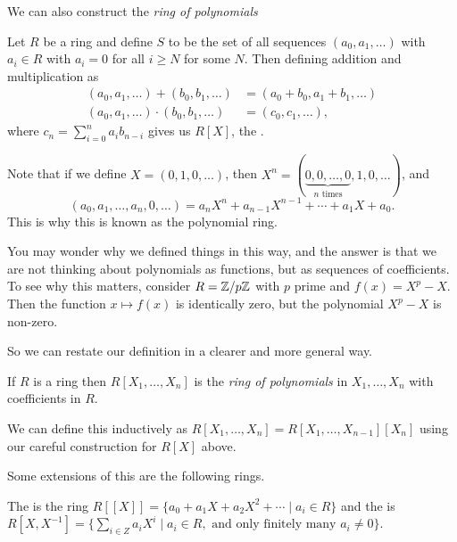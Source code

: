 \documentclass[a4paper]{scrreprt}
\begin{document}
 We can also construct the \emph{ring of polynomials} 

\begin{definition}
	Let $R$ be a ring and define $S$ to be  the set of all sequences $(a_0, a_1, \dots)$ with $a_i \in R$ with $a_i = 0$ for all $i \geq N$ for some $N$. Then defining addition and multiplication as
		 \begin{align*}
			 (a_0, a_1, \dots) + (b_0, b_1, \dots) &= (a_0 + b_0, a_1 + b_1, \dots) \\
			 (a_0, a_1, \dots) \cdot (b_0, b_1, \dots) &= (c_0, c_1, \dots),
		 \end{align*}
		 where $c_n = \sum_{i = 0}^n a_i b_{n - i}$ gives us $R[X]$, the .
\end{definition}

Note that if we define $X = (0, 1, 0, \dots)$, then $X^n = (\underbrace{0, 0, \dots, 0}_{\text{$n$ times}}, 1, 0, \dots)$, and
$$
(a_0, a_1, \dots, a_n, 0, \dots) = a_n X^n + a_{n - 1}X^{n - 1} + \cdots + a_1 X + a_0.
$$
This is why this is known as the polynomial ring.

You may wonder why we defined things in this way, and the answer is that we are not thinking about polynomials as functions, but as sequences of coefficients. To see why this matters, consider $R = \mathbb{Z}/p\mathbb{Z}$ with $p$ prime and $f(x) = X^p - X$. Then the function $x \mapsto f(x)$ is identically zero, but the polynomial $X^p - X$ is non-zero.

So we can restate our definition in a clearer and more general way.

\begin{definition}
	If $R$ is a ring then $R[X_1, \dots, X_n]$ is the \emph{ring of polynomials} in $X_1, \dots, X_n$ with coefficients in $R$.
\end{definition}

\begin{remark}
We can define this inductively as $R[X_1, \dots, X_n] = R[X_1, \dots, X_{n - 1}][X_n]$ using our careful construction for $R[X]$ above.
\end{remark}

Some extensions of this are the following rings.

\begin{definition}
	The  is the ring $R[[X]] = \{a_0 + a_1 X + a_2X^2 + \cdots \mid a_i \in R\}$ and the  is $R[X, X^{-1}] = \{\sum_{i \in Z}a_iX^{i} \mid a_i \in R, \text{ and only finitely many $a_i \neq 0$}\}$.
\end{definition}
\end{document}
